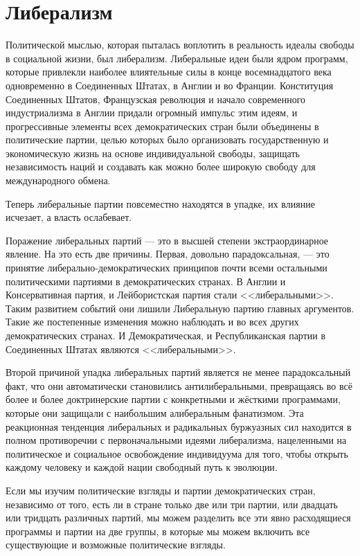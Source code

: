 \chapter{Либерализм}

Политической мыслью, которая пыталась воплотить в реальность идеалы свободы в социальной жизни, был либерализм. Либеральные идеи были ядром программ, которые привлекли наиболее влиятельные силы в конце восемнадцатого века одновременно в Соединенных Штатах, в Англии и во Франции. Конституция Соединенных Штатов, Французская революция и начало современного индустриализма в Англии придали огромный импульс этим идеям, и прогрессивные элементы всех демократических стран были объединены в политические партии, целью которых было организовать государственную и экономическую жизнь на основе индивидуальной свободы, защищать независимость наций и создавать как можно более широкую свободу для международного обмена.
 
Теперь либеральные партии повсеместно находятся в упадке, их влияние исчезает, а власть ослабевает.
 
Поражение либеральных партий — это в высшей степени экстраординарное явление. На это есть две причины. Первая, довольно парадоксальная, — это принятие либерально-демократических принципов почти всеми остальными политическими партиями в демократических странах. В Англии и Консервативная партия, и Лейбористская партия стали <<либеральными>>. Таким развитием событий они лишили Либеральную партию главных аргументов. Такие же постепенные изменения можно наблюдать и во всех других демократических странах. И Демократическая, и Республиканская партии в Соединенных Штатах являются <<либеральными>>.

Второй причиной упадка либеральных партий является не менее парадоксальный факт, что они автоматически становились антилиберальными, превращаясь во всё более и более доктринерские партии с конкретными и жёсткими программами, которые они защищали с наибольшим алиберальным фанатизмом. Эта реакционная тенденция либеральных и радикальных буржуазных сил находится в полном противоречии с первоначальными идеями либерализма, нацеленными на политическое и социальное освобождение индивидуума для того, чтобы открыть каждому человеку и каждой нации свободный путь к эволюции.

Если мы изучим политические взгляды и партии демократических стран, независимо от того, есть ли в стране только две или три партии, или двадцать или тридцать различных партий, мы можем разделить все эти явно расходящиеся программы и партии на две группы, в которые мы можем включить все существующие и возможные политические взгляды.

